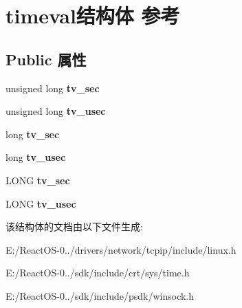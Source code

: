 \hypertarget{structtimeval}{}\section{timeval结构体 参考}
\label{structtimeval}
\subsection*{Public 属性}
\begin{DoxyCompactItemize}
\item 
\mbox{\label{structtimeval_a3599199839a89e99a2ce29d45312b5cf}} 
unsigned long {\bfseries tv\+\_\+sec}
\item 
\mbox{\label{structtimeval_aa8396731f2914f9ed2a457d3da602b80}} 
unsigned long {\bfseries tv\+\_\+usec}
\item 
\mbox{\label{structtimeval_a3599199839a89e99a2ce29d45312b5cf}} 
long {\bfseries tv\+\_\+sec}
\item 
\mbox{\label{structtimeval_aa8396731f2914f9ed2a457d3da602b80}} 
long {\bfseries tv\+\_\+usec}
\item 
\mbox{\label{structtimeval_a4ee141d70b0462cb0e7a79bc475ac790}} 
L\+O\+NG {\bfseries tv\+\_\+sec}
\item 
\mbox{\label{structtimeval_a31957e6ecf05906b8da158f2f10bb96a}} 
L\+O\+NG {\bfseries tv\+\_\+usec}
\end{DoxyCompactItemize}


该结构体的文档由以下文件生成\+:\begin{DoxyCompactItemize}
\item 
E\+:/\+React\+O\+S-\/0../drivers/network/tcpip/include/linux.\+h\item 
E\+:/\+React\+O\+S-\/0../sdk/include/crt/sys/time.\+h\item 
E\+:/\+React\+O\+S-\/0../sdk/include/psdk/winsock.\+h\end{DoxyCompactItemize}

